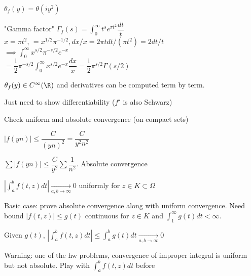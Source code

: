 \documentclass[twoside, 10pt]{article}
\begin{document}
$\theta_f(y) = \theta(iy^2)$

"Gamma factor" $\Gamma_f(s) = \int_0^\infty t^se^{\pi t^2} \dfrac{dt}{t}$\\
$x = \pi t^2$, $ = x^{1/2}\pi^{-1/2}, dx/x = 2\pi t dt/(\pi t^2) = 2dt/t$\\
$\implies \int_0^\infty x^{s/2}\pi^{-s/2}e^{-x}$\\
$ = \dfrac{1}{2}\pi^{-s/2}\int_0^\infty x^{s/2}e^{-x} \dfrac{dx}{x} = \dfrac{1}{2}\pi^{s/2} \Gamma(s/2)$

\begin{lem}
   $\theta_f(y) \in C^\infty(\R)$ and derivatives can be computed term by term. 
\end{lem}
Just need to show differentiability ($f'$ is also Schwarz)

Check uniform and absolute convergence (on compact sets)

$|f(yn)| \leq \dfrac{C}{(yn)^2} = \dfrac{C}{y^2n^2}$

$\sum |f(yn)| \leq \dfrac{C}{y^2}\sum\dfrac{1}{n^2}$. Absolute convergence

$\left| \int_a^b f(t, z) dt\right| \underset{a, b \to \infty} {\to}0$ uniformly for $z \in K \subset \Omega$

Basic case: prove absolute convergence along with uniform convergence. Need bound $|f(t, z)| \leq g(t)$ continuous for $z\in K$ and $\int_1^{\infty} g(t) dt < \infty$.

Given $g(t)$, $\left|\int_a^b f(t, z) dt\right| \leq \int_a^b g(t) dt \underset{a, b \to \infty}{\to} 0$

Warning: one of the hw problems, convergence of improper integral is uniform but not absolute. Play with $\int_a^b f(t, z) dt$ before 
\end{document}
